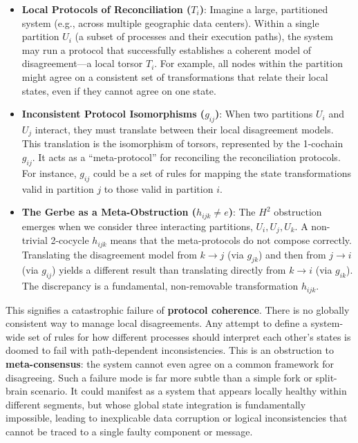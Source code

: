 \documentclass[
]{article}
\begin{document}
\begin{itemize}
\item
  \textbf{Local Protocols of Reconciliation (\(T_i\))}: Imagine a large,
  partitioned system (e.g., across multiple geographic data centers).
  Within a single partition \(U_i\) (a subset of processes and their
  execution paths), the system may run a protocol that successfully
  establishes a coherent model of disagreement---a local torsor \(T_i\).
  For example, all nodes within the partition might agree on a
  consistent set of transformations that relate their local states, even
  if they cannot agree on one state.
\item
  \textbf{Inconsistent Protocol Isomorphisms (\(g_{ij}\))}: When two
  partitions \(U_i\) and \(U_j\) interact, they must translate between
  their local disagreement models. This translation is the isomorphism
  of torsors, represented by the 1-cochain \(g_{ij}\). It acts as a
  ``meta-protocol'' for reconciling the reconciliation protocols. For
  instance, \(g_{ij}\) could be a set of rules for mapping the state
  transformations valid in partition \(j\) to those valid in partition
  \(i\).
\item
  \textbf{The Gerbe as a Meta-Obstruction (\(h_{ijk} \neq e\))}: The
  \(H^2\) obstruction emerges when we consider three interacting
  partitions, \(U_i, U_j, U_k\). A non-trivial 2-cocycle \(h_{ijk}\)
  means that the meta-protocols do not compose correctly. Translating
  the disagreement model from \(k \to j\) (via \(g_{jk}\)) and then from
  \(j \to i\) (via \(g_{ij}\)) yields a different result than
  translating directly from \(k \to i\) (via \(g_{ik}\)). The
  discrepancy is a fundamental, non-removable transformation
  \(h_{ijk}\).
\end{itemize}

This signifies a catastrophic failure of \textbf{protocol coherence}.
There is no globally consistent way to manage local disagreements. Any
attempt to define a system-wide set of rules for how different processes
should interpret each other's states is doomed to fail with
path-dependent inconsistencies. This is an obstruction to
\textbf{meta-consensus}: the system cannot even agree on a common
framework for disagreeing. Such a failure mode is far more subtle than a
simple fork or split-brain scenario. It could manifest as a system that
appears locally healthy within different segments, but whose global
state integration is fundamentally impossible, leading to inexplicable
data corruption or logical inconsistencies that cannot be traced to a
single faulty component or message.
\end{document}
